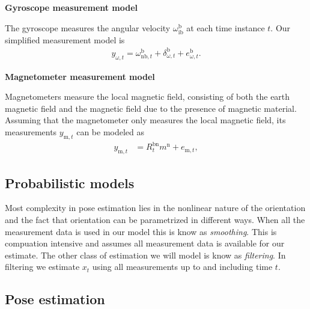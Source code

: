 \documentclass{article}
\begin{document}
\textbf{Gyroscope measurement model}

The gyroscope measures the angular velocity $\omega_{\text{ib}}^\text{b}$ at each time instance $t$. Our simplified
measurement model is
\begin{align}
\label{eq:models-gyrMeasModel}
y_{\omega,t} = \omega_{\text{nb},t}^\text{b} + \delta_{\omega,t}^\text{b} + e_{\omega,t}^\text{b}.
\end{align}

\textbf{Magnetometer measurement model}

Magnetometers measure the local magnetic field, consisting of both the earth magnetic field and the magnetic field due to the presence of magnetic material.
Assuming that the magnetometer only measures the local magnetic field, its measurements $y_{\text{m},t}$ can be modeled as
\begin{align}
\label{eq:models-magMeasModel}
y_{\text{m},t} &= R^\text{bn}_t m^\text{n} + e_{\text{m},t}, 
\end{align}

\subsection{Probabilistic models}

Most complexity in pose estimation lies in the nonlinear nature of the orientation and the fact that orientation can be parametrized in different ways.
When all the measurement data is used in our model this is know as \textit{smoothing}. This is compuation intensive and assumes all measurement data is available
for our estimate. The other class of estimation we will model is know as \textit{filtering}. In filtering we estimate $x_t$ using all measurements up to and including time $t$.

\subsection{Pose estimation}
\end{document}
